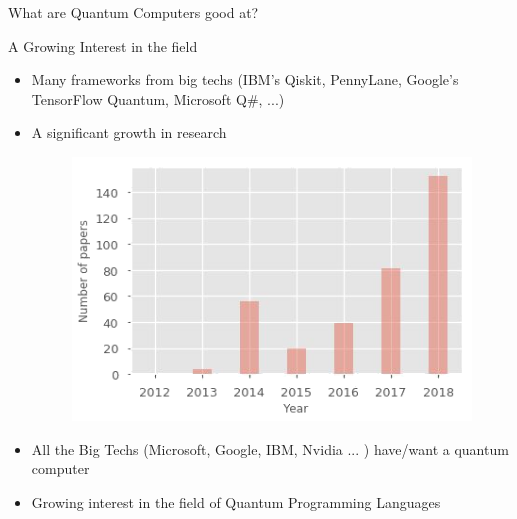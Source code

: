 \begin{frame}[fragile]{What are Quantum Computers good at?}
    \begin{figure}[h!]
         \captionsetup[subfloat]{labelformat=empty}
          \quad
		  \quad
    \end{figure}
\end{frame}


\begin{frame}[fragile]{A Growing Interest in the field}
	\begin{itemize}
	 \item Many frameworks from big techs (IBM's Qiskit, PennyLane, Google's TensorFlow Quantum, Microsoft Q\#, ...)
	 \item  A significant growth in research
	   \begin{figure}[!htb]
	           \includegraphics[width=0.5\linewidth]{plot_interest}\quad
	    \end{figure}
	 \item  All the Big Techs (Microsoft, Google, IBM, Nvidia ... ) have/want a quantum computer
	 \item  Growing interest in the field of Quantum Programming Languages
	\end{itemize}
\end{frame}